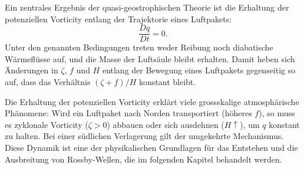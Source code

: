 Ein zentrales Ergebnis der quasi-geostrophischen Theorie ist die Erhaltung der
potenziellen Vorticity entlang der Trajektorie eines Luftpakets:
\begin{equation}
	\frac{Dq}{Dt} = 0.
	\label{rossby:eq:pv_conservation}
\end{equation}
Unter den genannten Bedingungen treten weder Reibung noch diabatische Wärmeflüsse auf, und die Masse der Luftsäule bleibt erhalten.
Damit heben sich Änderungen in \(\zeta\), \(f\) und \(H\) entlang der Bewegung eines Luftpakets gegenseitig so auf, dass das Verhältnis \((\zeta + f)/H\) konstant bleibt.

Die Erhaltung der potenziellen Vorticity erklärt viele grossskalige atmosphärische Phänomene: Wird ein Luftpaket nach Norden transportiert (höheres \(f\)), so muss es zyklonale
Vorticity (\(\zeta > 0\)) abbauen oder sich ausdehnen (\(H \uparrow\)), um
\(q\) konstant zu halten. Bei einer südlichen Verlagerung gilt der umgekehrte
Mechanismus. Diese Dynamik ist eine der physikalischen Grundlagen für das
Entstehen und die Ausbreitung von Rossby-Wellen, die im folgenden Kapitel
behandelt werden.
